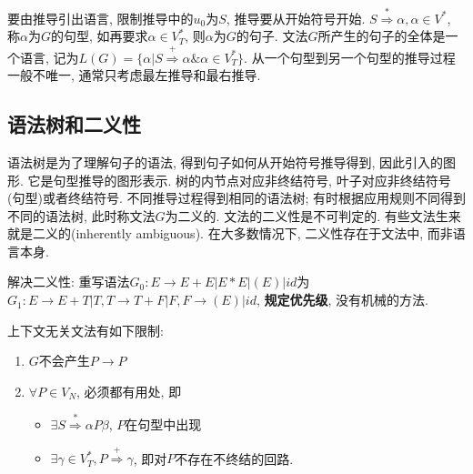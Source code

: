         要由推导引出语言, 限制推导中的$u_0$为$S$, 推导要从开始符号开始. $S\stackrel{*}{\Rightarrow}\alpha, \alpha\in V^*$, 称$\alpha$为$G$的\textsf{句型}, 如再要求$\alpha\in V_T^*$, 则$\alpha$为$G$的\textsf{句子}. 文法$G$所产生的句子的全体是一个\textsf{语言}, 记为$L(G)=\{\alpha|S\stackrel{+}{\Rightarrow}\alpha\&\alpha\in V_T^*\}$. 从一个句型到另一个句型的推导过程一般不唯一, 通常只考虑最左推导和最右推导.

    \subsection{语法树和二义性}

        \textsf{语法树}是为了理解句子的语法, 得到句子如何从开始符号推导得到, 因此引入的图形. 它是句型推导的图形表示. 树的内节点对应非终结符号, 叶子对应非终结符号(句型)或者终结符号. 不同推导过程得到相同的语法树; 有时根据应用规则不同得到不同的语法树, 此时称文法$G$为\textsf{二义的}. 文法的二义性是不可判定的. 有些文法生来就是二义的(inherently ambiguous). 在大多数情况下, 二义性存在于文法中, 而非语言本身.

        解决二义性: 重写语法$G_0:E\to E+E|E*E|(E)|id$为$G_1:E\to E+T|T, T\to T+F|F, F\to(E)|id$, \textbf{规定优先级}, 没有机械的方法.

        上下文无关文法有如下限制:

        \begin{enumerate}
            \item $G$不会产生$P\to P$
            \item $\forall P\in V_N$, 必须都有用处, 即
                \begin{itemize}
                    \item $\exists S\stackrel{*}{\Rightarrow} \alpha P\beta$, $P$在句型中出现
                    \item $\exists \gamma\in V_T^*, P\stackrel{+}{\Rightarrow}\gamma$, 即对$P$不存在不终结的回路.
                \end{itemize}
        \end{enumerate}

